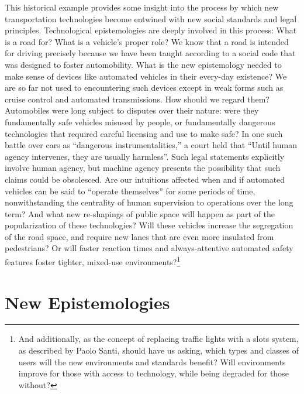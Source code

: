 This historical
example provides some insight into the process by which new
transportation technologies become entwined with new social standards
and legal principles. Technological epistemologies are deeply involved
in this process: What is a road for? What is a vehicle's
proper role? We know that a road is intended for driving precisely
because we have been taught according to a social code that was
designed to foster automobility. What is the new epistemology needed
to make sense of devices like 
automated vehicles in their every-day existence? We are so far not
used to encountering such devices
except in weak forms such as cruise control and automated
transmissions. How should we regard them?
Automobiles were long subject to disputes over their nature: were they
fundamentally safe vehicles misused by people, or fundamentally
dangerous technologies that required careful licensing and use to
make safe? In one such battle over cars as ``dangerous
instrumentalities,'' a court held that ``Until human agency intervenes, they are usually
harmless''\cite[p. 10]{???-lochlannjain}. Such legal statements
explicitly involve human agency, but machine agency presents the
possibility that such claims could be obsolesced. Are our intuitions
affected when and if automated vehicles can be said to ``operate
themselves'' for some periods of time, nonwithstanding the centrality
of human supervision to operations over the long term?
And what new re-shapings of public space will happen as part of the 
popularization of these technologies? Will these vehicles increase the
segregation of the road space, and require new lanes that are even
more insulated from pedestrians? Or will faster reaction times and
always-attentive automated safety features foster tighter, mixed-use
environments?\footnote{And additionally, as the concept of replacing traffic
lights with a slots system, as described by Paolo Santi, should have
us asking, which types and classes of users will the new environments
and standards benefit? Will environments improve for those with access
to technology, while being degraded for those without?}

\section{New Epistemologies}

